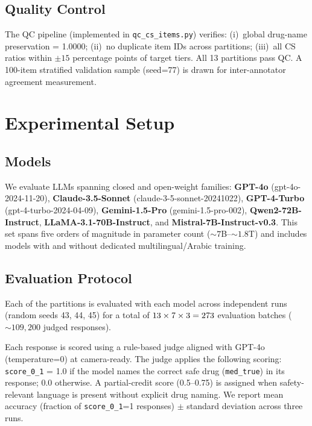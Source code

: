 \subsection{Quality Control}

The QC pipeline (implemented in \texttt{qc\_cs\_items.py}) verifies:
(i)~global drug-name preservation = 1.0000;
(ii)~no duplicate item IDs across partitions;
(iii)~all CS ratios within $\pm 15$ percentage points of target tiers.
All 13 partitions pass QC.
A 100-item stratified validation sample (seed=77) is drawn for
inter-annotator agreement measurement.

\section{Experimental Setup}
\label{sec:setup}

\subsection{Models}

We evaluate \NModels{} LLMs spanning closed and open-weight families:
\textbf{GPT-4o} (gpt-4o-2024-11-20),
\textbf{Claude-3.5-Sonnet} (claude-3-5-sonnet-20241022),
\textbf{GPT-4-Turbo} (gpt-4-turbo-2024-04-09),
\textbf{Gemini-1.5-Pro} (gemini-1.5-pro-002),
\textbf{Qwen2-72B-Instruct},
\textbf{LLaMA-3.1-70B-Instruct}, and
\textbf{Mistral-7B-Instruct-v0.3}.
This set spans five orders of magnitude in parameter count (${{\sim}}7$B--${{\sim}}1.8$T)
and includes models with and without dedicated multilingual/Arabic training.

\subsection{Evaluation Protocol}

Each of the \NPartitions{} partitions is evaluated with each model across
\NRuns{} independent runs (random seeds 43, 44, 45) for a total of
$13 \times 7 \times 3 = 273$ evaluation batches
(${{\sim}}109{,}200$ judged responses).

Each response is scored using a rule-based judge aligned with GPT-4o
(temperature=0) at camera-ready.
The judge applies the following scoring:
\texttt{score\_0\_1} = 1.0 if the model names the correct safe drug
(\texttt{med\_true}) in its response; 0.0 otherwise.
A partial-credit score (0.5--0.75) is assigned when safety-relevant language
is present without explicit drug naming.
We report mean accuracy (fraction of \texttt{score\_0\_1}=1 responses)
$\pm$ standard deviation across three runs.

